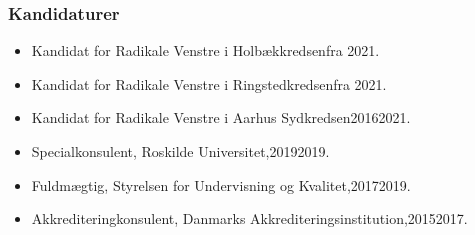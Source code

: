 \documentclass[11pt, a4paper]{awesome-cv}
\begin{document}
\begin{cvletter}
\subsubsection*{Kandidaturer}
\begin{itemize}
\item Kandidat for Radikale Venstre i Holbækkredsenfra 2021.
\item Kandidat for Radikale Venstre i Ringstedkredsenfra 2021.
\item Kandidat for Radikale Venstre i Aarhus Sydkredsen20162021.
\end{itemize}
\begin{itemize}
\item Specialkonsulent, Roskilde Universitet,20192019.
\item Fuldmægtig, Styrelsen for Undervisning og Kvalitet,20172019.
\item Akkrediteringkonsulent, Danmarks Akkrediteringsinstitution,20152017.
\end{itemize}
\end{cvletter}
\end{document}
